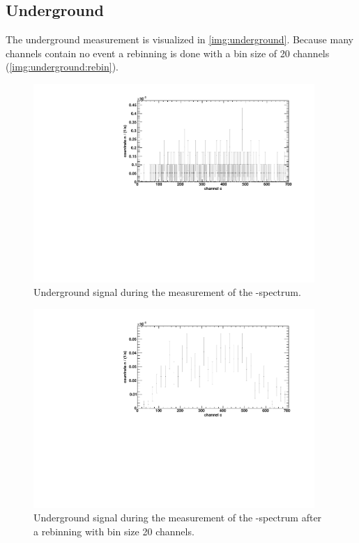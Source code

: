 \subsection{Underground}
The underground measurement is visualized in \autoref{img:underground}. Because many channels contain no event a rebinning is done with a 
bin size of 20 channels (\autoref{img:underground:rebin}).
\begin{figure}[H]
\begin{center}
  \includegraphics[width=0.95\textwidth]{../img/underground.pdf}
  \caption{Underground signal during the measurement of the \textbeta-spectrum.}
  \label{img:underground}
\end{center}
\end{figure}

\begin{figure}[H]
\begin{center}
  \includegraphics[width=0.95\textwidth]{../img/underground_rebin.pdf}
  \caption{Underground signal during the measurement of the \textbeta-spectrum after a rebinning with bin size 20 channels.}
  \label{img:underground:rebin}
\end{center}
\end{figure}

